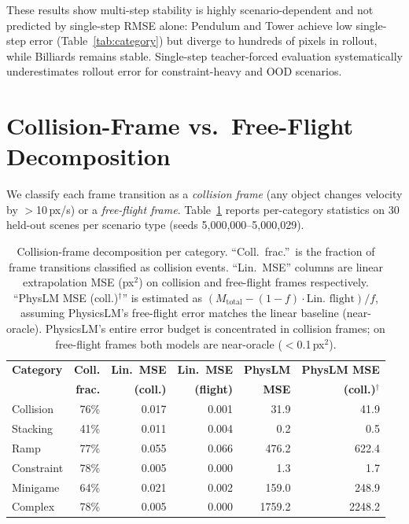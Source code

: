\documentclass{article}
\begin{document}
\noindent These results show multi-step stability is highly scenario-dependent
and not predicted by single-step RMSE alone: Pendulum and Tower achieve low
single-step error (Table~\ref{tab:category}) but diverge to hundreds of pixels
in rollout, while Billiards remains stable. Single-step teacher-forced evaluation
systematically underestimates rollout error for constraint-heavy and OOD scenarios.

\section{Collision-Frame vs.\ Free-Flight Decomposition}
\label{app:collisiondecomp}

We classify each frame transition as a \emph{collision frame}
(any object changes velocity by $>$10\,px/s) or a \emph{free-flight frame}.
Table~\ref{tab:colldecomp} reports per-category statistics on 30 held-out scenes
per scenario type (seeds 5{,}000{,}000--5{,}000{,}029).

\begin{table}[h]
\centering
\caption{Collision-frame decomposition per category.
``Coll.\ frac.''\ is the fraction of frame transitions classified as collision events.
``Lin.\ MSE'' columns are linear extrapolation MSE (px$^2$) on collision and
free-flight frames respectively.
``PhysLM MSE (coll.)$^\dagger$'' is estimated as
$(M_\text{total} - (1-f)\cdot\text{Lin.\ flight}) / f$,
assuming PhysicsLM's free-flight error matches the linear baseline (near-oracle).
PhysicsLM's entire error budget is concentrated in collision frames;
on free-flight frames both models are near-oracle ($<$0.1\,px$^2$).}
\label{tab:colldecomp}
\small
\begin{tabular}{lrrrrr}
\toprule
\textbf{Category} & \textbf{Coll.} & \textbf{Lin.\ MSE} & \textbf{Lin.\ MSE} & \textbf{PhysLM} & \textbf{PhysLM MSE}\\
                  & \textbf{frac.} & \textbf{(coll.)}   & \textbf{(flight)}  & \textbf{MSE}    & \textbf{(coll.)$^\dagger$}\\
\midrule
Collision  & 76\% & 0.017 & 0.001 &   31.9 &   41.9 \\
Stacking   & 41\% & 0.011 & 0.004 &    0.2 &    0.5 \\
Ramp       & 77\% & 0.055 & 0.066 &  476.2 &  622.4 \\
Constraint & 78\% & 0.005 & 0.000 &    1.3 &    1.7 \\
Minigame   & 64\% & 0.021 & 0.002 &  159.0 &  248.9 \\
Complex    & 78\% & 0.005 & 0.000 & 1759.2 & 2248.2 \\
\bottomrule
\end{tabular}
\end{table}
\end{document}
